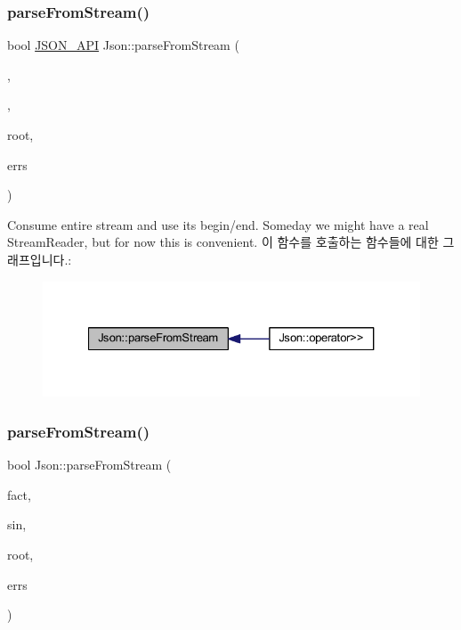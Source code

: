 \subsubsection{\texorpdfstring{parse\+From\+Stream()}{parseFromStream()}\hspace{0.1cm}{\footnotesize\ttfamily [1/2]}}
{\footnotesize\ttfamily bool \hyperlink{json_8h_a1d61ffde86ce1a18fd83194ff0d9a206}{J\+S\+O\+N\+\_\+\+A\+PI} Json\+::parse\+From\+Stream (\begin{DoxyParamCaption}\item[{\hyperlink{class_json_1_1_char_reader_1_1_factory}{Char\+Reader\+::\+Factory} const \&}]{,  }\item[{\hyperlink{json_8h_a15f2f70b2ce0a2abd0f8112393dbc4de}{J\+S\+O\+N\+C\+P\+P\+\_\+\+I\+S\+T\+R\+E\+AM} \&}]{,  }\item[{\hyperlink{class_json_1_1_value}{Value} $\ast$}]{root,  }\item[{std\+::string $\ast$}]{errs }\end{DoxyParamCaption})}

Consume entire stream and use its begin/end. Someday we might have a real Stream\+Reader, but for now this is convenient. 이 함수를 호출하는 함수들에 대한 그래프입니다.\+:\nopagebreak
\begin{figure}[H]
\begin{center}
\leavevmode
\includegraphics[width=327pt]{namespace_json_aab0cf1ecf81d1aeca12be2a416a84352_icgraph}
\end{center}
\end{figure}
\mbox{\label{namespace_json_a38f903cfdb57a6c4e86a7dcc42f3712c}} 
\subsubsection{\texorpdfstring{parse\+From\+Stream()}{parseFromStream()}\hspace{0.1cm}{\footnotesize\ttfamily [2/2]}}
{\footnotesize\ttfamily bool Json\+::parse\+From\+Stream (\begin{DoxyParamCaption}\item[{\hyperlink{class_json_1_1_char_reader_1_1_factory}{Char\+Reader\+::\+Factory} const \&}]{fact,  }\item[{\hyperlink{json_8h_a15f2f70b2ce0a2abd0f8112393dbc4de}{J\+S\+O\+N\+C\+P\+P\+\_\+\+I\+S\+T\+R\+E\+AM} \&}]{sin,  }\item[{\hyperlink{class_json_1_1_value}{Value} $\ast$}]{root,  }\item[{\hyperlink{json_8h_a1e723f95759de062585bc4a8fd3fa4be}{J\+S\+O\+N\+C\+P\+P\+\_\+\+S\+T\+R\+I\+NG} $\ast$}]{errs }\end{DoxyParamCaption})}



